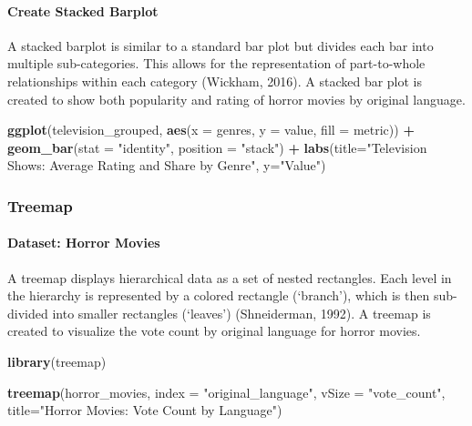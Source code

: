 \documentclass[
]{book}
\newenvironment{Shaded}{\begin{snugshade}}{\end{snugshade}}
\newcommand{\AttributeTok}[1]{\textcolor[rgb]{0.13,0.29,0.53}{#1}}
\newcommand{\FunctionTok}[1]{\textcolor[rgb]{0.13,0.29,0.53}{\textbf{#1}}}
\newcommand{\NormalTok}[1]{#1}
\newcommand{\SpecialCharTok}[1]{\textcolor[rgb]{0.81,0.36,0.00}{\textbf{#1}}}
\newcommand{\StringTok}[1]{\textcolor[rgb]{0.31,0.60,0.02}{#1}}
\begin{document}
\paragraph*{Create Stacked Barplot}\label{create-stacked-barplot}

A stacked barplot is similar to a standard bar plot but divides each bar into multiple sub-categories. This allows for the representation of part-to-whole relationships within each category (Wickham, 2016). A stacked bar plot is created to show both popularity and rating of horror movies by original language.

\begin{Shaded}
\begin{Highlighting}[]
\FunctionTok{ggplot}\NormalTok{(television\_grouped, }\FunctionTok{aes}\NormalTok{(}\AttributeTok{x =}\NormalTok{ genres, }\AttributeTok{y =}\NormalTok{ value, }\AttributeTok{fill =}\NormalTok{ metric)) }\SpecialCharTok{+}
  \FunctionTok{geom\_bar}\NormalTok{(}\AttributeTok{stat =} \StringTok{"identity"}\NormalTok{, }\AttributeTok{position =} \StringTok{"stack"}\NormalTok{) }\SpecialCharTok{+}
  \FunctionTok{labs}\NormalTok{(}\AttributeTok{title=}\StringTok{"Television Shows: Average Rating and Share by Genre"}\NormalTok{, }\AttributeTok{y=}\StringTok{"Value"}\NormalTok{) }
\end{Highlighting}
\end{Shaded}

\subsubsection*{Treemap}\label{treemap}

\paragraph*{Dataset: Horror Movies}\label{dataset-horror-movies}

A treemap displays hierarchical data as a set of nested rectangles. Each level in the hierarchy is represented by a colored rectangle (`branch'), which is then sub-divided into smaller rectangles (`leaves') (Shneiderman, 1992). A treemap is created to visualize the vote count by original language for horror movies.

\begin{Shaded}
\begin{Highlighting}[]
\FunctionTok{library}\NormalTok{(treemap)}

\FunctionTok{treemap}\NormalTok{(horror\_movies, }
        \AttributeTok{index =} \StringTok{"original\_language"}\NormalTok{, }
        \AttributeTok{vSize =} \StringTok{"vote\_count"}\NormalTok{, }
        \AttributeTok{title=}\StringTok{"Horror Movies: Vote Count by Language"}\NormalTok{)}
\end{Highlighting}
\end{Shaded}
\end{document}
